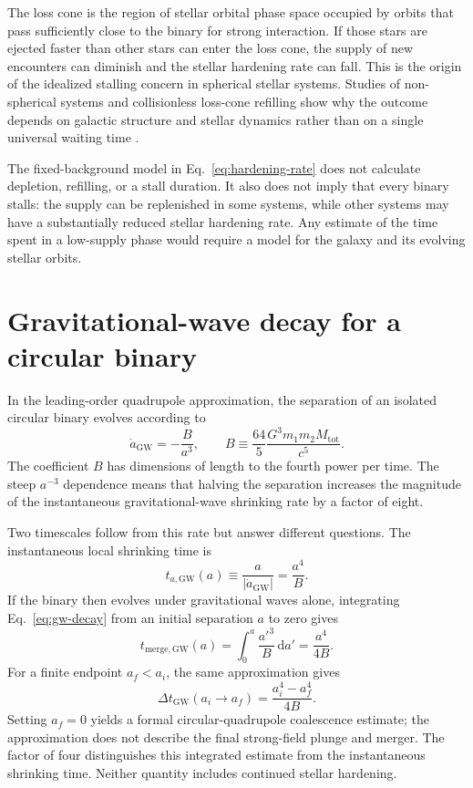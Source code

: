 \documentclass[12pt]{article}
\begin{document}
The loss cone is the region of stellar orbital phase space occupied by orbits that pass sufficiently close to the binary for strong interaction. If those stars are ejected faster than other stars can enter the loss cone, the supply of new encounters can diminish and the stellar hardening rate can fall. This is the origin of the idealized stalling concern in spherical stellar systems. Studies of non-spherical systems and collisionless loss-cone refilling show why the outcome depends on galactic structure and stellar dynamics rather than on a single universal waiting time \cite{Gualandris,Vasiliev}.

The fixed-background model in Eq.~\eqref{eq:hardening-rate} does not calculate depletion, refilling, or a stall duration. It also does not imply that every binary stalls: the supply can be replenished in some systems, while other systems may have a substantially reduced stellar hardening rate. Any estimate of the time spent in a low-supply phase would require a model for the galaxy and its evolving stellar orbits.

\section{Gravitational-wave decay for a circular binary}

In the leading-order quadrupole approximation, the separation of an isolated circular binary evolves according to \cite{Peters}
\begin{equation}
  \dot a_{\mathrm{GW}}=-\frac{B}{a^3},
  \qquad
  B\equiv\frac{64}{5}
  \frac{G^3m_1m_2M_{\mathrm{tot}}}{c^5}.
  \label{eq:gw-decay}
\end{equation}
The coefficient $B$ has dimensions of length to the fourth power per time. The steep $a^{-3}$ dependence means that halving the separation increases the magnitude of the instantaneous gravitational-wave shrinking rate by a factor of eight.

Two timescales follow from this rate but answer different questions. The instantaneous local shrinking time is
\begin{equation}
  t_{a,\mathrm{GW}}(a)\equiv\frac{a}{|\dot a_{\mathrm{GW}}|}
  =\frac{a^4}{B}.
  \label{eq:gw-local-time}
\end{equation}
If the binary then evolves under gravitational waves alone, integrating Eq.~\eqref{eq:gw-decay} from an initial separation $a$ to zero gives
\begin{equation}
  t_{\mathrm{merge,GW}}(a)
  =\int_0^a\frac{a'^3}{B}\,\mathrm{d}a'
  =\frac{a^4}{4B}.
  \label{eq:gw-merger-time}
\end{equation}
For a finite endpoint $a_f<a_i$, the same approximation gives
\begin{equation}
  \Delta t_{\mathrm{GW}}(a_i\to a_f)
  =\frac{a_i^4-a_f^4}{4B}.
  \label{eq:gw-finite-endpoint}
\end{equation}
Setting $a_f=0$ yields a formal circular-quadrupole coalescence estimate; the approximation does not describe the final strong-field plunge and merger. The factor of four distinguishes this integrated estimate from the instantaneous shrinking time. Neither quantity includes continued stellar hardening.
\end{document}
